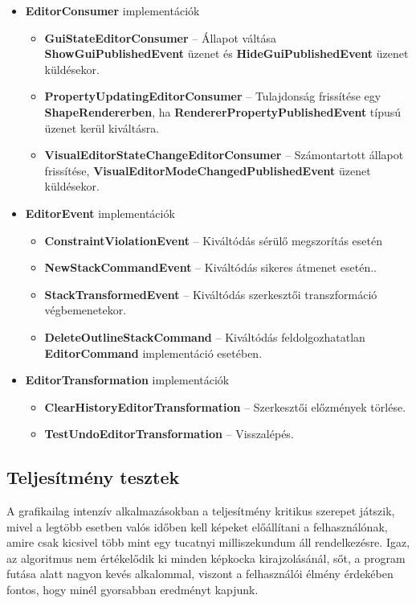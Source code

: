 \begin{itemize}
\begin{itemize}
    \end{itemize}
    \item \textbf{EditorConsumer} implementációk
    \begin{itemize}
        \item \textbf{GuiStateEditorConsumer} -- Állapot váltása \textbf{ShowGuiPublishedEvent} üzenet és \textbf{HideGuiPublishedEvent} üzenet küldésekor.
        \item \textbf{PropertyUpdatingEditorConsumer} -- Tulajdonság frissítése egy \textbf{ShapeRendererben}, ha \textbf{RendererPropertyPublishedEvent} típusú üzenet kerül kiváltásra.
        \item \textbf{VisualEditorStateChangeEditorConsumer} -- Számontartott állapot frissítése, \textbf{VisualEditorModeChangedPublishedEvent} üzenet küldésekor.
    \end{itemize}
    \item \textbf{EditorEvent} implementációk
    \begin{itemize}
        \item \textbf{ConstraintViolationEvent} -- Kiváltódás sérülő megszorítás esetén
        \item \textbf{NewStackCommandEvent} -- Kiváltódás sikeres átmenet esetén..
        \item \textbf{StackTransformedEvent} -- Kiváltódás szerkesztői transzformáció végbemenetekor.
        \item \textbf{DeleteOutlineStackCommand} -- Kiváltódás feldolgozhatatlan \textbf{EditorCommand} implementáció esetében.
    \end{itemize}
    \item \textbf{EditorTransformation} implementációk
    \begin{itemize}
        \item \textbf{ClearHistoryEditorTransformation} -- Szerkesztői előzmények törlése.
        \item \textbf{TestUndoEditorTransformation} -- Visszalépés.
    \end{itemize}
\end{itemize}

\subsection{Teljesítmény tesztek}

A grafikailag intenzív alkalmazásokban a teljesítmény kritikus szerepet játszik, mivel a legtöbb esetben valós időben kell képeket előállítani a felhasználónak, amire csak kicsivel több mint egy tucatnyi milliszekundum áll rendelkezésre. Igaz, az algoritmus nem értékelődik ki minden képkocka kirajzolásánál, sőt, a program futása alatt nagyon kevés alkalommal, viszont a felhasználói élmény érdekében fontos, hogy minél gyorsabban eredményt kapjunk.

